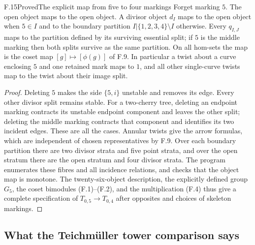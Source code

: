\begin{statement}{F.15}{Proved}{The explicit map from five to four
markings}
Forget marking $5$.  The open object maps to the open object.
A divisor object $d_I$ maps to the open object when $5\in I$ and to
the boundary partition $I|\{1,2,3,4\}\setminus I$ otherwise.
Every $q_{I,J}$ maps to the partition defined by its surviving
essential split; if $5$ is the middle marking then both splits
survive as the same partition.  On all hom-sets the map is the coset
map $[g]\mapsto[\phi(g)]$ of F.9.  In particular a twist about a
curve enclosing $5$ and one retained mark maps to $1$, and all other
single-curve twists map to the twist about their image split.
\end{statement}
\begin{proof}
Deleting $5$ makes the side $\{5,i\}$ unstable and removes its edge.
Every other divisor split remains stable.  For a two-cherry tree,
deleting an endpoint marking contracts its unstable endpoint
component and leaves the other split; deleting the middle marking
contracts that component and identifies its two incident edges.
These are all the cases.  Annular twists give the arrow formulas,
which are independent of chosen representatives by F.9.  Over each
boundary partition there are two divisor strata and five point
strata, and over the open stratum there are the open stratum and
four divisor strata.  The program enumerates these fibres and all
incidence relations, and checks that the object map is monotone.
The twenty-six-object description, the explicitly defined group
$G_5$, the coset bimodules (F.1)--(F.2), and the multiplication (F.4)
thus give a complete specification of $T_{0,5}\to T_{0,4}$ after
opposites and choices of skeleton markings.
\end{proof}

\subsection{What the Teichm\"uller tower comparison says}

